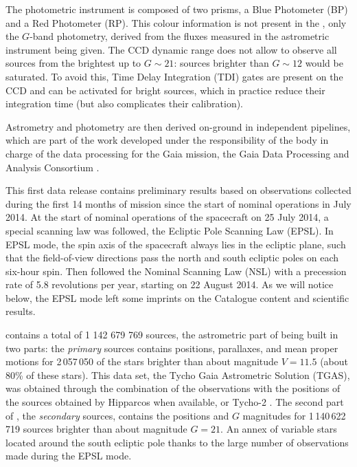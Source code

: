 The photometric instrument is composed of two prisms, a Blue Photometer (BP)
and a Red Photometer (RP). This colour information is not present in the
{}, only the $G$-band photometry, derived from the fluxes measured in 
the astrometric instrument being given. The CCD dynamic range does
not allow to observe all sources from the brightest up to $G\sim 21$: sources 
brighter than $G\sim 12$ would be saturated. To avoid this, 
Time Delay Integration (TDI) gates are present
on the CCD and can be activated for bright sources, which in practice reduce 
their integration time (but also complicates their calibration).

Astrometry and photometry are then derived on-ground in independent pipelines, 
which are part of the work developed under the responsibility of the
body in charge of the data processing for the Gaia mission, the 
Gaia Data Processing and Analysis Consortium \citep[DPAC,][]{DPACP-8}.

This first data release 
contains preliminary results based on observations collected during the
first 14 months of mission since the start of nominal operations in July
2014.  At the start of nominal operations of the spacecraft on 25 July
2014, a special scanning law was followed, the Ecliptic Pole Scanning
Law (EPSL).  In EPSL mode, the spin axis of the spacecraft always lies
in the ecliptic plane, such that the field-of-view directions pass the
north and south ecliptic poles on each six-hour spin.  Then followed
the Nominal Scanning Law (NSL) with a precession rate of 5.8 revolutions
per year, starting on 22 August 2014.  As we will notice below, the EPSL
mode left some imprints on the Catalogue content and scientific results.

{} contains a total of 1 142 679 769 sources, the astrometric part of {} 
being built in two parts: the {\it primary} sources contains positions, parallaxes, 
and mean proper motions for 2\,057\,050 of the stars brighter than about
magnitude $V=11.5$ (about 80\% of these stars).
This data set, the Tycho Gaia Astrometric Solution (TGAS), was obtained through the combination 
of the {\gaia} observations with the positions of the sources obtained by Hipparcos
\citep{1997ESASP1200.....E} when available, or Tycho-2 \citep{2000A&A...355L..27H}.
The second part of {}, the {\it secondary} sources, contains the positions and $G$ magnitudes
for 1\,140\,622\,719 sources brighter than about magnitude $G=21$. An annex of variable
stars located around the south ecliptic pole   thanks to the 
large number of observations made during the EPSL mode. 

